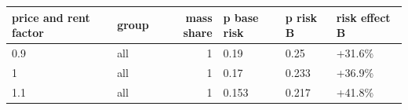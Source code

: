 \begingroup\small
\setlength{\tabcolsep}{3pt}
\renewcommand{\arraystretch}{1.04}
\begin{tabularx}{\linewidth}{XXrXXX}
\toprule
price and rent factor & group & mass share & p base risk & p risk B & risk effect B \\
\midrule
0.9 & all & 1 & 0.19 & 0.25 & +31.6\% \\
1 & all & 1 & 0.17 & 0.233 & +36.9\% \\
1.1 & all & 1 & 0.153 & 0.217 & +41.8\% \\
\bottomrule
\end{tabularx}
\endgroup
